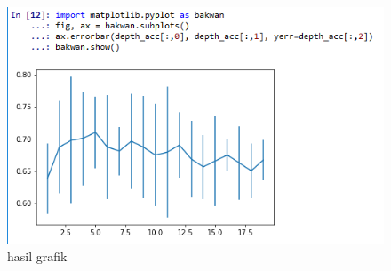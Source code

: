 \begin{enumerate}
\begin{figure}[ht]
      \centerline{\includegraphics[width=1\textwidth]
      {figures/cokro/hasil12}}
      \caption{hasil grafik }
      \label{hasil12}
      \end{figure}
\end{enumerate}

